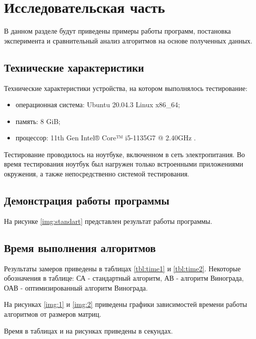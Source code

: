 \chapter{Исследовательская часть}

В данном разделе будут приведены примеры работы программ, постановка эксперимента и сравнительный анализ алгоритмов на основе полученных данных.

\section{Технические характеристики}

Технические характеристики устройства, на котором выполнялось тестирование:

\begin{itemize}
	\item операционная система: Ubuntu 20.04.3 \cite{ubuntu} Linux \cite{linux} x86\_64;
	\item память: 8 GiB;
	\item процессор: 11th Gen Intel® Core™ i5-1135G7 @ 2.40GHz \cite{intel}.
\end{itemize}

Тестирование проводилось на ноутбуке, включенном в сеть электропитания. Во время тестирования ноутбук был нагружен только встроенными приложениями окружения, а также непосредственно системой тестирования.

\section{Демонстрация работы программы}

На рисунке \ref{img:standart} представлен результат работы программы.


\section{Время выполнения алгоритмов}

Результаты замеров приведены в таблицах \ref{tbl:time1} и \ref{tbl:time2}. Некоторые обозначения в таблице: СА - стандартный алгоритм, АВ - алгоритм Винограда, ОАВ - оптимизированный алгоритм Винограда.

На рисунках \ref{img:1} и \ref{img:2} приведены графики зависимостей времени работы алгоритмов от размеров матриц.

Время в таблицах и на рисунках приведены в секундах.

